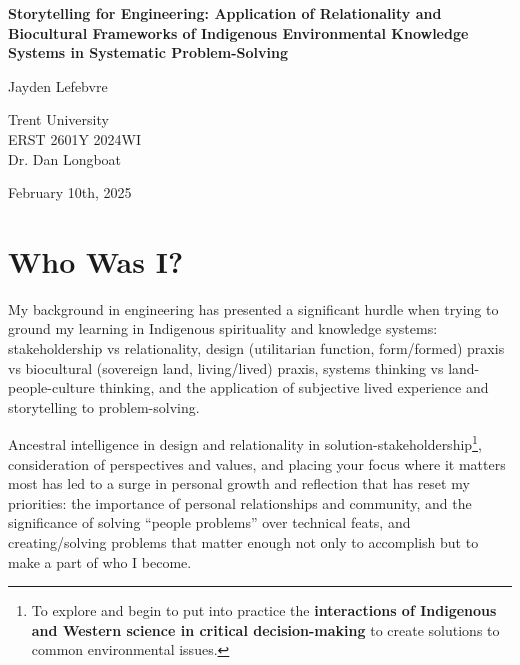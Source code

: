 \documentclass{report}
\begin{document}
\begin{titlepage}
    \begin{center}
        \vspace*{1.2cm}

        \textbf{Storytelling for Engineering: Application of Relationality and Biocultural Frameworks of Indigenous Environmental Knowledge Systems in Systematic Problem-Solving}

        \vspace{2cm}

        Jayden Lefebvre\\

        \vspace{5cm}
        
        Trent University\\
        ERST 2601Y 2024WI\\
        Dr. Dan Longboat\\

        \vfill

        February 10th, 2025
        
    \end{center}
\end{titlepage}

\clearpage

\section{Who Was I?}

My background in engineering has presented a significant hurdle when trying to ground my learning in Indigenous spirituality and knowledge systems: stakeholdership vs relationality, design (utilitarian function, form/formed) praxis vs biocultural (sovereign land, living/lived) praxis, systems thinking vs land-people-culture thinking, and the application of subjective lived experience and storytelling to problem-solving.

Ancestral intelligence in design and relationality in solution-stakeholdership\footnote{To explore and begin to put into practice the \textbf{interactions of Indigenous and Western science in critical decision-making} to create solutions to common environmental issues.}, consideration of perspectives and values, and placing your focus where it matters most has led to a surge in personal growth and reflection that has reset my priorities: the importance of personal relationships and community, and the significance of solving ``people problems'' over technical feats, and creating/solving problems that matter enough not only to accomplish but to make a part of who I become.
\end{document}
